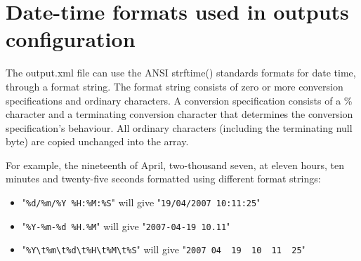\section{Date-time formats used in outputs configuration}

The output.xml file can use the ANSI strftime() standards formats for date time, through a format string. 
The format string consists of zero or more conversion specifications and ordinary characters.
A conversion specification consists of a \% character and a terminating conversion character that determines the conversion specification's behaviour.
All ordinary characters (including the terminating null byte) are copied unchanged into the array.

\bigskip

For example, the nineteenth of April, two-thousand seven, at eleven hours, ten minutes and twenty-five seconds formatted using different format strings:
\begin{itemize}
\item "\verb|%d/%m/%Y %H:%M:%S|" will give "\verb|19/04/2007 10:11:25|"
\item "\verb|%Y-%m-%d %H.%M|" will give "\verb|2007-04-19 10.11|"
\item "\verb|%Y\t%m\t%d\t%H\t%M\t%S|" will give "\verb|2007	04	19	10	11	25|"
\end{itemize}

